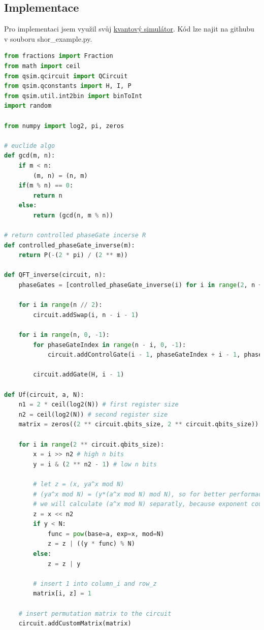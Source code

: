 \documentclass[11pt]{article}
\begin{document}
\subsection{Implementace}
Pro implementaci jsem využil svůj \hyperref[sec:QuantumEmulator]{kvantový simulátor}.
Kód lze najit na githubu v souboru shor\_example.py.
\begin{lstlisting}[language=Python, caption=Shor algorithm]
from fractions import Fraction
from math import ceil
from qsim.qcircuit import QCircuit
from qsim.qconstants import H, I, P
from qsim.util.int2bin import binToInt
import random

from numpy import log2, pi, zeros

# euclide algo
def gcd(m, n):
    if m < n: 
        (m, n) = (n, m)
    if(m % n) == 0:
        return n 
    else:
        return (gcd(n, m % n))

# return controlled phaseGate incerse R
def controlled_phaseGate_inverse(m):
    return P(-(2 * pi) / (2 ** m))

def QFT_inverse(circuit, n):
    phaseGates = [controlled_phaseGate_inverse(i) for i in range(2, n + 1)]

    for i in range(n // 2):
        circuit.addSwap(i, n - i - 1)

    for i in range(n, 0, -1):
        for phaseGateIndex in range(n - i, 0, -1):
            circuit.addControlGate(i - 1, phaseGateIndex + i - 1, phaseGates[phaseGateIndex - 1])

        circuit.addGate(H, i - 1)

def Uf(circuit, a, N):
    n1 = 2 * ceil(log2(N)) # first register size
    n2 = ceil(log2(N)) # second register size
    matrix = zeros((2 ** circuit.qbits_size, 2 ** circuit.qbits_size)) # fill matrix with zeros

    for i in range(2 ** circuit.qbits_size):
        x = i >> n2 # high n bits
        y = i & (2 ** n2 - 1) # low n bits

        # let z = (x, ya^x mod N)
        # (ya^x mod N) = (y*(a^x mod N) mod N), so for better performace
        # we will calculate (a^x mod N) separatly, because exponent could be large
        z = x << n2
        if y < N:
            func = pow(base=a, exp=x, mod=N) 
            z = z | ((y * func) % N) 
        else:
            z = z | y

        # insert 1 into column_i and row_z
        matrix[i, z] = 1
    
    # insert permutation matrix to the circuit
    circuit.addCustomMatrix(matrix)


\end{lstlisting}
\end{document}
